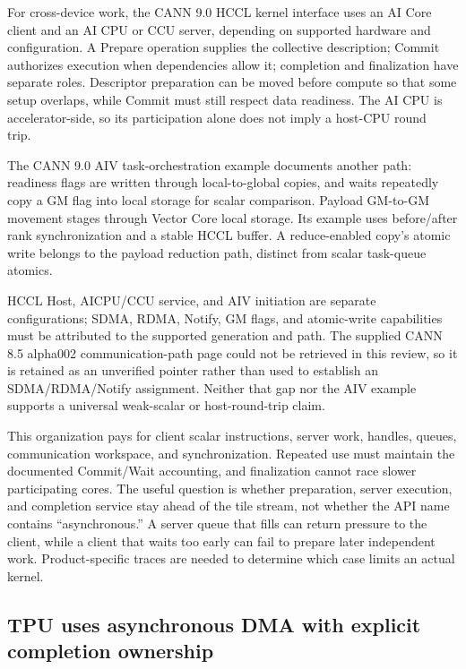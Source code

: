 For cross-device work, the CANN 9.0 HCCL kernel interface uses an AI Core client and an AI CPU or CCU server, depending on supported hardware and configuration. A Prepare operation supplies the collective description; Commit authorizes execution when dependencies allow it; completion and finalization have separate roles. Descriptor preparation can be moved before compute so that some setup overlaps, while Commit must still respect data readiness. The AI CPU is accelerator-side, so its participation alone does not imply a host-CPU round trip.~\citep{u006-hccl}

The CANN 9.0 AIV task-orchestration example documents another path: readiness flags are written through local-to-global copies, and waits repeatedly copy a GM flag into local storage for scalar comparison. Payload GM-to-GM movement stages through Vector Core local storage. Its example uses before/after rank synchronization and a stable HCCL buffer. A reduce-enabled copy's atomic write belongs to the payload reduction path, distinct from scalar task-queue atomics.\citep{u006-hccl-aiv}

HCCL Host, AICPU/CCU service, and AIV initiation are separate configurations; SDMA, RDMA, Notify, GM flags, and atomic-write capabilities must be attributed to the supported generation and path. The supplied CANN 8.5 alpha002 communication-path page could not be retrieved in this review, so it is retained as an unverified pointer rather than used to establish an SDMA/RDMA/Notify assignment. Neither that gap nor the AIV example supports a universal weak-scalar or host-round-trip claim.

This organization pays for client scalar instructions, server work, handles, queues, communication workspace, and synchronization. Repeated use must maintain the documented Commit/Wait accounting, and finalization cannot race slower participating cores. The useful question is whether preparation, server execution, and completion service stay ahead of the tile stream, not whether the API name contains ``asynchronous.'' A server queue that fills can return pressure to the client, while a client that waits too early can fail to prepare later independent work. Product-specific traces are needed to determine which case limits an actual kernel.

\subsection{TPU uses asynchronous DMA with explicit completion ownership}

